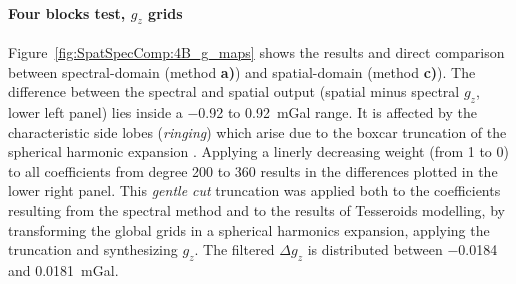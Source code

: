 \begin{subappendices}
\paragraph*{Four blocks test, $g_z$ grids}
Figure~\ref{fig:SpatSpecComp:4B_g_maps} shows the results and direct comparison between spectral-domain (method \textbf{a)}) and spatial-domain (method \textbf{c)}).
The difference between the spectral and spatial output (spatial minus spectral $g_z$, lower left panel) lies inside a \num{-0.92} to \SI{0.92}{\milli Gal} range.
It is affected by the characteristic side lobes (\textit{ringing}) which arise due to the boxcar truncation of the spherical harmonic expansion \parencite{BarthelmesGentleCut2008}.
Applying a linerly decreasing weight (from 1 to 0) to all coefficients from degree 200 to 360 results in the differences plotted in the lower right panel.
This \textit{gentle cut} truncation was applied both to the coefficients resulting from the spectral method and to the results of Tesseroids modelling, by transforming the global grids in a spherical harmonics expansion, applying the truncation and synthesizing $g_z$.
The filtered $\Delta g_z$ is distributed between \num{-0.0184} and \SI{0.0181}{\milli Gal}.


\end{subappendices}
